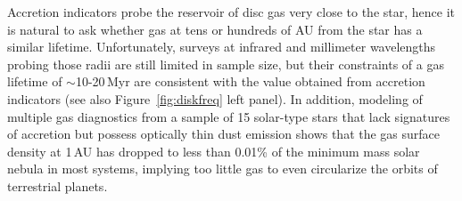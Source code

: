 \documentclass{rsos}
\begin{document}
Accretion indicators probe the reservoir of disc gas very close to the star, hence it is natural to ask whether gas at tens or hundreds of AU from the star has a similar lifetime. Unfortunately, surveys at infrared and millimeter wavelengths probing those radii are still limited in sample size, but their constraints of a gas lifetime of $\sim$10-20\,Myr are consistent with the value obtained from accretion indicators \cite{1995Natur.373..494Z,2006ApJ...651.1177P,2013PASP..125..477D} (see also Figure~\ref{fig:diskfreq} left panel). In addition, modeling of multiple gas diagnostics from a sample of 15 solar-type stars that lack signatures of accretion but possess optically thin dust emission shows that the gas surface density at 1\,AU has dropped to less than 0.01\% of the minimum mass solar nebula \cite{2006ApJ...651.1177P} in most systems, implying too little gas to even circularize the orbits of terrestrial planets.
\end{document}
